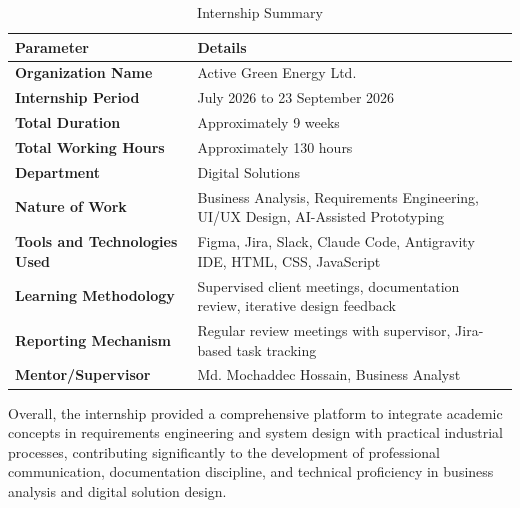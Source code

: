 \begin{table}[H]
\centering
\caption{Internship Summary}
\label{tab:internship-summary}
\renewcommand{\arraystretch}{1.4}
\begin{tabularx}{\textwidth}{|>{\centering\arraybackslash}p{5cm}|>{\arraybackslash}X|}
\hline
\textbf{Parameter} & \textbf{Details} \\
\hline
\textbf{Organization Name} & Active Green Energy Ltd. \\
\hline
\textbf{Internship Period} & 23 July 2026 to 23 September 2026 \\
\hline
\textbf{Total Duration} & Approximately 9 weeks \\
\hline
\textbf{Total Working Hours} & Approximately 130 hours \\
\hline
\textbf{Department} & Digital Solutions \\
\hline
\textbf{Nature of Work} & Business Analysis, Requirements Engineering, UI/UX Design, AI-Assisted Prototyping \\
\hline
\textbf{Tools and Technologies Used} & Figma, Jira, Slack, Claude Code, Antigravity IDE, HTML, CSS, JavaScript \\
\hline
\textbf{Learning Methodology} & Supervised client meetings, documentation review, iterative design feedback \\
\hline
\textbf{Reporting Mechanism} & Regular review meetings with supervisor, Jira-based task tracking \\
\hline
\textbf{Mentor/Supervisor} & Md. Mochaddec Hossain, Business Analyst \\
\hline
\end{tabularx}
\end{table}

\par Overall, the internship provided a comprehensive platform to integrate academic concepts in requirements engineering and system design with practical industrial processes, contributing significantly to the development of professional communication, documentation discipline, and technical proficiency in business analysis and digital solution design.
